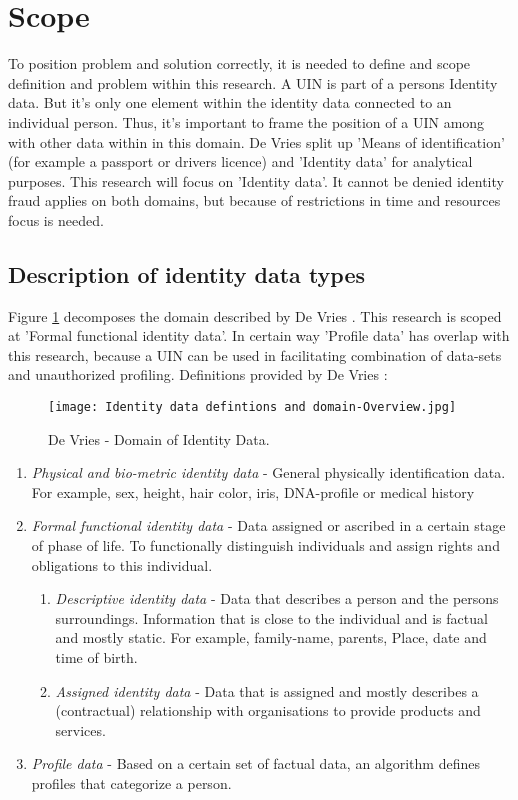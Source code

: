 \section{Scope}
To position problem and solution correctly, it is needed to define and scope definition and problem within this research. A UIN is part of a persons Identity data. But it's only one element within the identity data connected to an individual person. Thus, it's important to frame the position of a UIN among with other data within in this domain.
De Vries \etal \cite{Vries2007IdentiteitsfraudeEA} split up 'Means of identification' (for example a passport or drivers licence) and 'Identity data' for analytical purposes. This research will focus on 'Identity data'. It cannot be denied identity fraud applies on both domains, but because of restrictions in time and resources focus is needed. 

\subsection{Description of identity data types} \label{Identity_datatypes}
Figure \ref{fig:ID_domain} decomposes the domain described by De Vries \etal. This research is scoped at 'Formal functional identity data'. In certain way 'Profile data' has overlap with this research, because a UIN can be used in facilitating combination of data-sets and unauthorized profiling. Definitions provided by De Vries \etal: 
\graphicspath{ {./images/} }
\begin{figure}
\texttt{[image: Identity data defintions and domain-Overview.jpg]}\\
\caption{De Vries \etal - Domain of Identity Data.}
\label{fig:ID_domain}
\end{figure}
\begin{enumerate}
\item \textit{Physical and bio-metric identity data} - General physically identification data. For example, sex, height, hair color, iris, DNA-profile or medical history
\item \textit{Formal functional identity data} - Data assigned or ascribed in a certain stage of phase of life. To functionally distinguish individuals and assign rights and obligations to this individual.
\begin{enumerate}
\item \textit{Descriptive identity data} - Data that describes a person and the persons surroundings. Information that is close to the individual and is factual and mostly static. For example, family-name, parents, Place, date and time of birth. 
\item \textit{Assigned identity data} - Data that is assigned and mostly describes a (contractual) relationship with organisations to provide products and services.
\end{enumerate}
\item \textit{Profile data} - Based on a certain set of factual data, an algorithm defines profiles that categorize a person. 
\end{enumerate}


